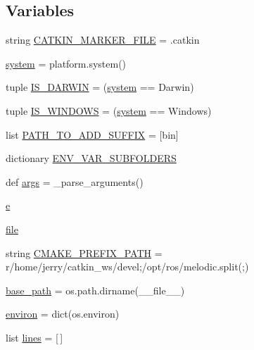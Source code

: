 \subsection*{Variables}
\begin{DoxyCompactItemize}
\item 
string \hyperlink{namespace__setup__util_a3fa0ca5a460a71a43cbc3d4954ab1f10}{C\+A\+T\+K\+I\+N\+\_\+\+M\+A\+R\+K\+E\+R\+\_\+\+F\+I\+LE} = \textquotesingle{}.catkin\textquotesingle{}
\item 
\hyperlink{namespace__setup__util_ae9fca6a80a6923f4580be72f68fee325}{system} = platform.\+system()
\item 
tuple \hyperlink{namespace__setup__util_aecbb100ce6f94bb3c7e16d58fde05f96}{I\+S\+\_\+\+D\+A\+R\+W\+IN} = (\hyperlink{namespace__setup__util_ae9fca6a80a6923f4580be72f68fee325}{system} == \textquotesingle{}Darwin\textquotesingle{})
\item 
tuple \hyperlink{namespace__setup__util_a6fe69c2dbd92959b6651a28cbb846e6e}{I\+S\+\_\+\+W\+I\+N\+D\+O\+WS} = (\hyperlink{namespace__setup__util_ae9fca6a80a6923f4580be72f68fee325}{system} == \textquotesingle{}Windows\textquotesingle{})
\item 
list \hyperlink{namespace__setup__util_a7de27b8c021c888c6288a885f1e9afa9}{P\+A\+T\+H\+\_\+\+T\+O\+\_\+\+A\+D\+D\+\_\+\+S\+U\+F\+F\+IX} = \mbox{[}\textquotesingle{}bin\textquotesingle{}\mbox{]}
\item 
dictionary \hyperlink{namespace__setup__util_aa31804f1be8660156ce9394b33c68dc4}{E\+N\+V\+\_\+\+V\+A\+R\+\_\+\+S\+U\+B\+F\+O\+L\+D\+E\+RS}
\item 
def \hyperlink{namespace__setup__util_a831491331b0650d492585147f04d6615}{args} = \+\_\+parse\+\_\+arguments()
\item 
\hyperlink{namespace__setup__util_acdce690b925de33d6249bbbfa1109d61}{e}
\item 
\hyperlink{namespace__setup__util_aea63a1b32cc79bc3d872ab7cb30dd07e}{file}
\item 
string \hyperlink{namespace__setup__util_a2a6756158bb4094ed7d259eb564d0578}{C\+M\+A\+K\+E\+\_\+\+P\+R\+E\+F\+I\+X\+\_\+\+P\+A\+TH} = r\textquotesingle{}/home/jerry/catkin\+\_\+ws/devel;/opt/ros/melodic\textquotesingle{}.split(\textquotesingle{};\textquotesingle{})
\item 
\hyperlink{namespace__setup__util_a83d25140acd7788bbcb95843fe38e639}{base\+\_\+path} = os.\+path.\+dirname(\+\_\+\+\_\+file\+\_\+\+\_\+)
\item 
\hyperlink{namespace__setup__util_a9a935bdd9ee1aa0327161025bb18c136}{environ} = dict(os.\+environ)
\item 
list \hyperlink{namespace__setup__util_a8618d8be5f729d4c9696daa5e083a001}{lines} = \mbox{[}$\,$\mbox{]}
\end{DoxyCompactItemize}


